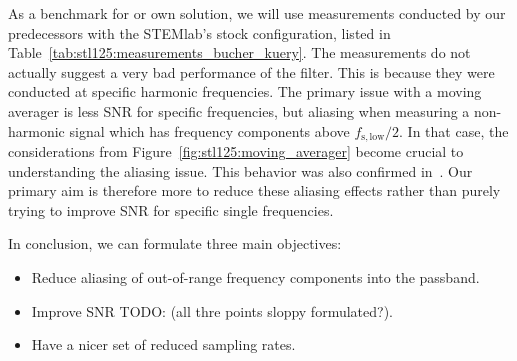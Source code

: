 As  a benchmark  for  or  own solution,  we  will  use measurements  conducted
by  our  predecessors  with  the  STEMlab's  stock  configuration,  listed  in
Table~\ref{tab:stl125:measurements_bucher_kuery}. The   measurements  do   not
actually  suggest  a very  bad  performance  of  the filter. This  is  because
they   were   conducted   at  specific   harmonic   frequencies. The   primary
issue  with  a   moving  averager  is  less  SNR   for  specific  frequencies,
but  aliasing  when  measuring  a  non-harmonic  signal  which  has  frequency
components above  $f_\mathrm{s,low}/2$. In that case, the  considerations from
Figure~\ref{fig:stl125:moving_averager}  become crucial  to understanding  the
aliasing issue.  This behavior was also confirmed in~\cite{bucher:kuery}.  Our
primary aim  is therefore more  to reduce  these aliasing effects  rather than
purely trying to improve SNR for specific single frequencies.

\begin{table}
    \centering
    \caption{%
        Measurement results  for STEMlab  125-14 from~\cite{bucher:kuery}. SNR
        was  determined for  a  specific harmonic  frequency  signal for  each
        sampling rate.%
    }
    \label{tab:stl125:measurements_bucher_kuery}
\end{table}

In conclusion, we can formulate three main objectives:
\begin{itemize}
    \item
        Reduce  aliasing   of  out-of-range  frequency  components   into  the
        passband.
    \item
        Improve SNR TODO: (all thre points sloppy formulated?).
    \item
        Have a nicer set of reduced sampling rates.
\end{itemize}

